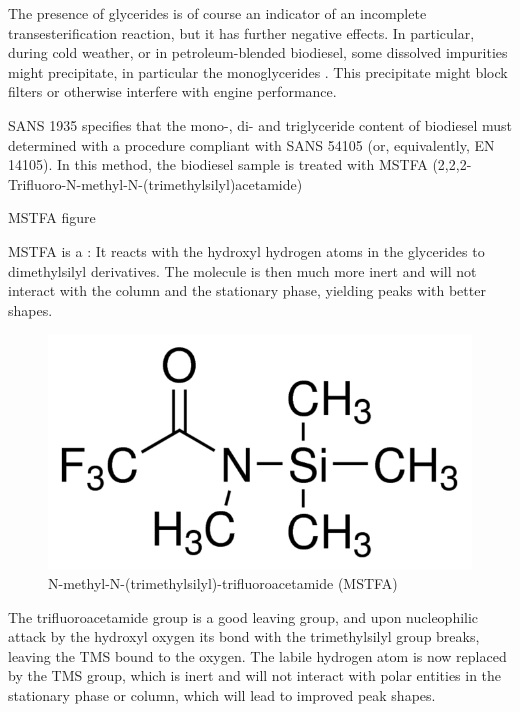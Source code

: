 The presence of glycerides is of course an indicator of an incomplete
transesterification reaction, but it has further negative effects. In
particular, during cold weather, or in petroleum-blended biodiesel, some
dissolved impurities might precipitate, in particular the monoglycerides
\autocite{Dunn2009,Plata2015}. This precipitate might block filters or otherwise
interfere with engine performance.

SANS 1935 specifies that the mono-, di- and triglyceride content of biodiesel
must determined with a procedure compliant with SANS 54105 (or, equivalently, EN
14105). In this method, the biodiesel sample is treated with MSTFA
(2,2,2-Trifluoro-N-methyl-N-(trimethylsilyl)acetamide)


MSTFA figure


MSTFA is a : It reacts with the hydroxyl
hydrogen atoms in the glycerides to dimethylsilyl derivatives. The molecule is
then much more inert and will not interact with the column and the stationary
phase, yielding peaks with better shapes. 

\begin{figure}
\centering
\includegraphics[width=\textwidth]{Figures/MSTFA.png}
\decoRule

\caption[MSTFA]{N-methyl-N-(trimethylsilyl)-trifluoroacetamide (MSTFA)}

\label{fig:MSTFA}
\end{figure}

The trifluoroacetamide group is a good leaving group, and upon nucleophilic
attack by the hydroxyl oxygen its bond with the trimethylsilyl group breaks,
leaving the TMS bound to the oxygen. The labile hydrogen atom is now replaced by
the TMS group, which is inert and will not interact with polar entities in the
stationary phase or column, which will lead to improved peak shapes. 

